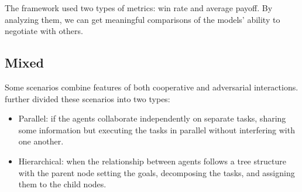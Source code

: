 The framework used two types of metrics: win rate and average payoff. By analyzing them, we can get meaningful comparisons of the models' ability to negotiate with others.

\subsection{Mixed}

Some scenarios combine features of both cooperative and adversarial interactions. \textcite{Li2024} further divided these scenarios into two types:

\begin{itemize}
    \item Parallel: if the agents collaborate independently on separate tasks, sharing some information but executing the tasks in parallel without interfering with one another. 
    \item Hierarchical: when the relationship between agents follows a tree structure with the parent node setting the goals, decomposing the tasks, and assigning them to the child nodes.
\end{itemize}

